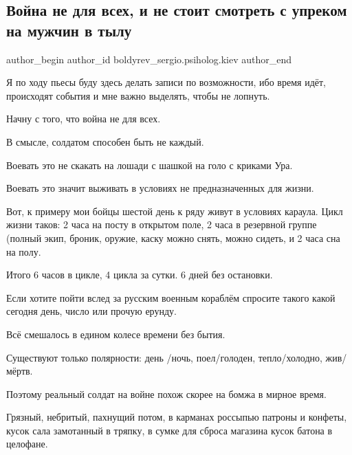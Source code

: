  
 
 
 
 
 
\subsection{Война не для всех, и не стоит смотреть с упреком на мужчин в тылу}
\label{sec:08_03_2022.fb.boldyrev_sergio.psiholog.kiev.1.vojna_ne_dja_vseh}
 
\ifcmt
 author_begin
   author_id boldyrev_sergio.psiholog.kiev
 author_end
\fi

Я по ходу пьесы буду здесь делать записи по возможности, ибо время идёт,
происходят события и мне важно выделять, чтобы не лопнуть.

Начну с того, что война не для всех.

В смысле, солдатом способен быть не каждый.

Воевать это не скакать на лошади с шашкой на голо с криками Ура.

Воевать это значит выживать в условиях не предназначенных для жизни.

Вот, к примеру мои бойцы шестой день к ряду живут в условиях караула. Цикл
жизни таков: 2 часа на посту в открытом поле, 2 часа в резервной группе (полный
экип, броник, оружие, каску можно снять, можно сидеть, и 2 часа сна на полу.

Итого 6 часов в цикле, 4 цикла за сутки. 6 дней без остановки.

Если хотите пойти вслед за русским военным кораблём спросите такого какой
сегодня день, число или прочую ерунду.

Всё смешалось в едином колесе времени без бытия.

Существуют только полярности: день /ночь, поел/голоден, тепло/холодно,
жив/мёртв.

Поэтому реальный солдат на войне похож скорее на бомжа в мирное время.

Грязный, небритый, пахнущий потом, в карманах россыпью патроны и конфеты, кусок
сала замотанный в тряпку, в сумке для сброса магазина кусок батона в целофане.

